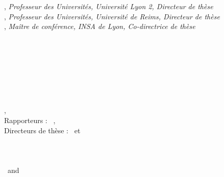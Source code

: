 \begin{titlepage}
	\hspace*{15pt}
	\begin{minipage}[t]{\textwidth}
		{\small \thesisFirstSupervisor, \textit{Professeur des Universités, Université Lyon 2, Directeur de thèse}} \\
	  	{\small \thesisSecondSupervisor, \textit{Professeur des Universités, Université de Reims, Directeur de thèse}} \\
		{\small \thesisThirdSupervisor, \textit{Maître de conférence, INSA de Lyon, Co-directrice de thèse}} \\
		{\small \thesisFirstReviewer} \\
		{\small \thesisSecondReviewer} \\
	\end{minipage} \\[5mm]


	\thesisDate \\

\end{titlepage}


\hfill
\vfill
{
	\small
	\textbf{\thesisName} \\
	\textit{\thesisTitle} \\
	\thesisSubject, \thesisDate \\
	Rapporteurs : \thesisFirstReviewer\, \thesisSecondReviewer, \thesisThirdReviewer \\
	Directeurs de thèse : \thesisFirstSupervisor\, \thesisSecondSupervisor{}  et \thesisThirdSupervisor \\[1.5em]
	\textbf{\thesisUniversity} \\
	\thesisUniversityInstitute \\
	\thesisUniversityStreetAddress \\
	\thesisUniversityPostalCode\ and \thesisUniversityCity
}
